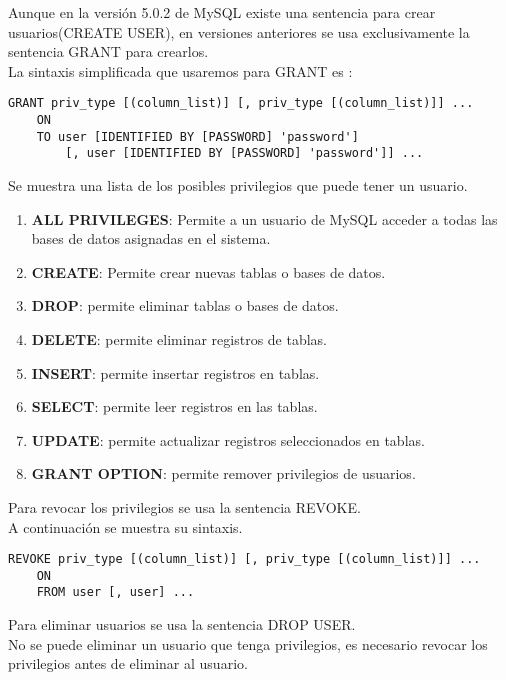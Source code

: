 \documentclass[12pt,a4paper]{article}
\begin{document}
Aunque en la versión 5.0.2 de MySQL existe una sentencia para crear usuarios(CREATE USER), en versiones anteriores se usa exclusivamente la sentencia GRANT para crearlos.\\
La sintaxis simplificada que usaremos para GRANT es :\\
\lstset{language=SQL, breaklines=true, basicstyle=\footnotesize}
\begin{lstlisting}[frame=single]
GRANT priv_type [(column_list)] [, priv_type [(column_list)]] ...
    ON 
    TO user [IDENTIFIED BY [PASSWORD] 'password']
        [, user [IDENTIFIED BY [PASSWORD] 'password']] ...

\end{lstlisting}

Se muestra una lista de los posibles privilegios que puede tener un usuario.\\
\begin{enumerate}
\item \textbf{ALL PRIVILEGES}: Permite a un usuario de MySQL acceder a todas las bases de datos asignadas en el sistema.
\item \textbf{CREATE}: Permite crear nuevas tablas o bases de datos.
\item \textbf{DROP}: permite eliminar tablas o bases de datos.
\item \textbf{DELETE}: permite eliminar registros de tablas.
\item \textbf{INSERT}: permite insertar registros en tablas.
\item \textbf{SELECT}: permite leer registros en las tablas.
\item \textbf{UPDATE}: permite actualizar registros seleccionados en tablas.
\item \textbf{GRANT OPTION}: permite remover privilegios de usuarios.
\end{enumerate}

Para revocar los privilegios se usa la sentencia REVOKE.\\
A continuación se muestra su sintaxis.
\lstset{language=SQL, breaklines=true, basicstyle=\footnotesize}
\begin{lstlisting}[frame=single]
REVOKE priv_type [(column_list)] [, priv_type [(column_list)]] ...
    ON 
    FROM user [, user] ...

\end{lstlisting}

Para eliminar usuarios se usa la sentencia DROP USER.\\
No se puede eliminar un usuario que tenga privilegios, es necesario revocar los privilegios antes de eliminar al usuario.
\end{document}
